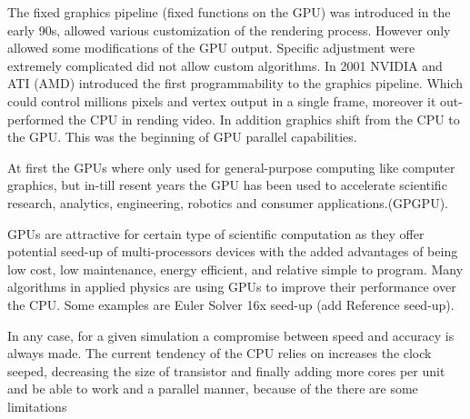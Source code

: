 The fixed graphics pipeline (fixed functions on the GPU) was introduced in the early 90s, allowed various customization of the rendering process. However only allowed some modifications of the GPU output. Specific adjustment were extremely complicated did not allow custom algorithms. In 2001 NVIDIA and ATI (AMD) introduced the first programmability to the graphics pipeline. Which could control millions pixels and vertex output in a single frame, moreover it out-performed the CPU in rending video. In addition graphics shift from the CPU to the GPU. This was the beginning of GPU parallel capabilities.

At first the GPUs where only used for general-purpose computing like computer graphics, but in-till resent years the GPU has been used to accelerate scientific research, analytics, engineering, robotics and consumer applications.(GPGPU)\cite{physicsgpu}.

GPUs are attractive for certain type of scientific computation as they offer potential seed-up of multi-processors devices with the added advantages of being low cost, low maintenance, energy efficient, and relative simple to program. Many algorithms in applied physics are using GPUs to improve their performance over the CPU. Some examples are Euler Solver 16x seed-up (add Reference seed-up).

In any case, for a given simulation a compromise between speed and accuracy is always made. The current tendency of the CPU relies on increases the clock seeped, decreasing the size of transistor and finally adding more cores per unit and be able to work and a parallel manner, because of the there are some limitations\cite{quantitative}

